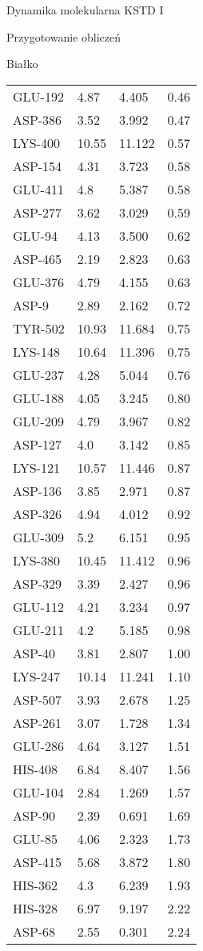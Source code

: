 \begin{section}{Dynamika molekularna KSTD I}
\begin{subsection}{Przygotowanie obliczeń}
\begin{subsubsection}{Białko}
\begin{longtable}{| p{} | p{} | p{} | p{} |}
GLU-192 & 4.87 & 4.405 & 0.46\\
ASP-386 & 3.52 & 3.992 & 0.47\\
LYS-400 & 10.55 & 11.122 & 0.57\\
ASP-154 & 4.31 & 3.723 & 0.58\\
GLU-411 & 4.8 & 5.387 & 0.58\\
ASP-277 & 3.62 & 3.029 & 0.59\\
GLU-94 & 4.13 & 3.500 & 0.62\\
ASP-465 & 2.19 & 2.823 & 0.63\\
GLU-376 & 4.79 & 4.155 & 0.63\\
ASP-9 & 2.89 & 2.162 & 0.72\\
TYR-502 & 10.93 & 11.684 & 0.75\\
LYS-148 & 10.64 & 11.396 & 0.75\\
GLU-237 & 4.28 & 5.044 & 0.76\\
GLU-188 & 4.05 & 3.245 & 0.80\\
GLU-209 & 4.79 & 3.967 & 0.82\\
ASP-127 & 4.0 & 3.142 & 0.85\\
LYS-121 & 10.57 & 11.446 & 0.87\\
ASP-136 & 3.85 & 2.971 & 0.87\\
ASP-326 & 4.94 & 4.012 & 0.92\\
GLU-309 & 5.2 & 6.151 & 0.95\\
LYS-380 & 10.45 & 11.412 & 0.96\\
ASP-329 & 3.39 & 2.427 & 0.96\\
GLU-112 & 4.21 & 3.234 & 0.97\\
GLU-211 & 4.2 & 5.185 & 0.98\\
ASP-40 & 3.81 & 2.807 & 1.00\\
LYS-247 & 10.14 & 11.241 & 1.10\\
ASP-507 & 3.93 & 2.678 & 1.25\\
ASP-261 & 3.07 & 1.728 & 1.34\\
GLU-286 & 4.64 & 3.127 & 1.51\\
HIS-408 & 6.84 & 8.407 & 1.56\\
GLU-104 & 2.84 & 1.269 & 1.57\\
ASP-90 & 2.39 & 0.691 & 1.69\\
GLU-85 & 4.06 & 2.323 & 1.73\\
ASP-415 & 5.68 & 3.872 & 1.80\\
HIS-362 & 4.3 & 6.239 & 1.93\\
HIS-328 & 6.97 & 9.197 & 2.22\\
ASP-68 & 2.55 & 0.301 & 2.24\\

\end{longtable}
\end{subsubsection}
\end{subsection}
\end{section}
